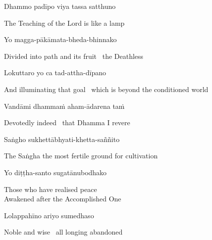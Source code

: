 Dhammo padīpo viya tassa satthuno

\begin{english}
  The Teaching of the Lord is like a lamp\hyperlink{endnote8-appendix}{\hypertarget{endnote8-body}{}}
\end{english}

Yo magga-pākāmata-bheda-bhinnako

\begin{english}
  Divided into path and its fruit \breathmark\ the Deathless\hyperlink{endnote9-appendix}{\hypertarget{endnote9-body}{}}
\end{english}

Lokuttaro yo ca tad-attha-dīpano

\begin{english-hang}
  And illuminating that goal \breathmark\ which is beyond the conditioned world\hyperlink{endnote10-appendix}{\hypertarget{endnote10-body}{}}
\end{english-hang}

Vandāmi dhammaṁ aham-ādarena taṁ

\begin{english}
  Devotedly indeed \breathmark\ that Dhamma I revere
\end{english}

Saṅgho sukhettābhyati-khetta-saññito

\begin{english}
  The Saṅgha the most fertile ground for cultivation
\end{english}

Yo diṭṭha-santo sugatānubodhako

\begin{english}
  Those who have realised peace\\
  Awakened after the Accomplished One
\end{english}

Lolappahīno ariyo sumedhaso

\begin{english}
  Noble and wise \breathmark\ all longing abandoned
\end{english}

